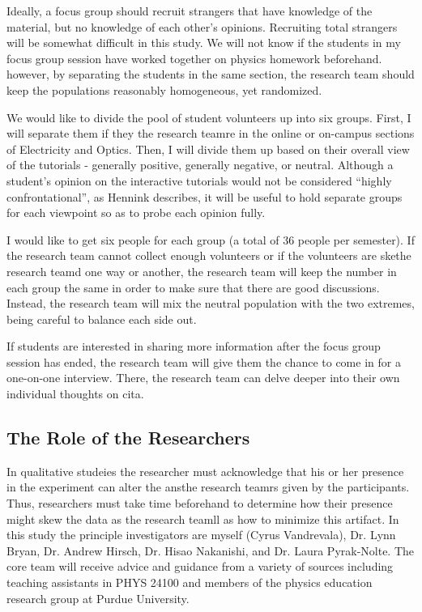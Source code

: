 Ideally, a focus group should recruit strangers that have knowledge of the material, but no knowledge of each other's opinions. Recruiting total strangers will be somewhat difficult in this study. We will not know if the students in my focus group session have worked together on physics homework beforehand. however, by separating the students in the same section, the research team should keep the populations reasonably homogeneous, yet randomized.

We would like to divide the pool of student volunteers up into six groups. First, I will separate them if they the research teamre in the online or on-campus sections of Electricity and Optics. Then, I will divide them up based on their overall view of the tutorials - generally positive, generally negative, or neutral. Although a student’s opinion on the interactive tutorials would not be considered “highly confrontational”, as Hennink describes, it will be useful to hold separate groups for each viewpoint so as to probe each opinion fully.

I would like to get six people for each group (a total of 36 people per semester). If the research team cannot collect enough volunteers or if the volunteers are skethe research teamd one way or another, the research team will keep the number in each group the same in order to make sure that there are good discussions. Instead, the research team will mix the neutral population with the two extremes, being careful to balance each side out.

If students are interested in sharing more information after the focus group session has ended, the research team will give them the chance to come in for a one-on-one interview. There, the research team can delve deeper into their own individual thoughts on \gls{cita}.

\subsection{The Role of the Researchers}

In qualitative studeies the researcher must acknowledge that his or her presence in the experiment can alter the ansthe research teamrs given by the participants. Thus, researchers must take time beforehand to determine how their presence might skew the data as the research teamll as how to minimize this artifact\cite{denzin2012}. In this study the principle investigators are myself (Cyrus Vandrevala), Dr. Lynn Bryan, Dr. Andrew Hirsch, Dr. Hisao Nakanishi, and Dr. Laura Pyrak-Nolte. The core team will receive advice and guidance from a variety of sources including teaching assistants in PHYS 24100 and members of the physics education research group at Purdue University.

